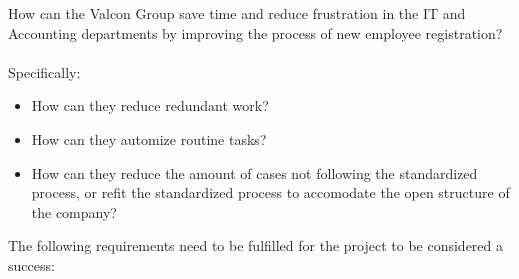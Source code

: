 How can the Valcon Group save time and reduce frustration in the IT and Accounting departments by improving the process of new employee registration?
\\\\
Specifically:
\begin{itemize}
\item How can they reduce redundant work?
\item How can they automize routine tasks?
\item How can they reduce the amount of cases not following the standardized process, or refit the standardized process to accomodate the open structure of the company?
\end{itemize}

The following requirements need to be fulfilled for the project to be considered a success:
